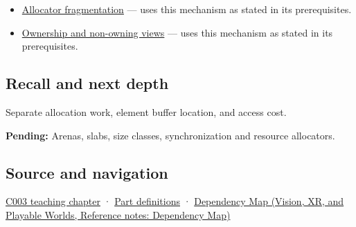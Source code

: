 \hypertarget{appendix-c3480f7d9ff3-used-by}{}

\begin{itemize}
\tightlist
\item
  \hyperref[appendix-a7c50686d81f]{Allocator fragmentation} --- uses this mechanism as stated in its prerequisites.
\item
  \hyperref[appendix-d52e4486f527]{Ownership and non-owning views} --- uses this mechanism as stated in its prerequisites.
\end{itemize}

\subsection{Recall and next depth}\label{appendix-c3480f7d9ff3-recall-and-next-depth}

\hypertarget{appendix-c3480f7d9ff3-recall-and-next-depth}{}

Separate allocation work, element buffer location, and access cost.

\textbf{Pending:} Arenas, slabs, size classes, synchronization and resource allocators.

\subsection{Source and navigation}\label{appendix-c3480f7d9ff3-source-and-navigation}

\hypertarget{appendix-c3480f7d9ff3-source-and-navigation}{}

\hyperref[01-foundations-i-ch002-where-the-bytes-live]{C003 teaching chapter} · \hyperref[appendix-fd090d982a15-m003---parts-41-60]{Part definitions} · \href{../07-Vision-XR-and-Playable-Worlds/main.pdf\#nameddest=appendix-4ad47bdd269a}{Dependency Map (Vision, XR, and Playable Worlds, Reference notes: Dependency Map)}
